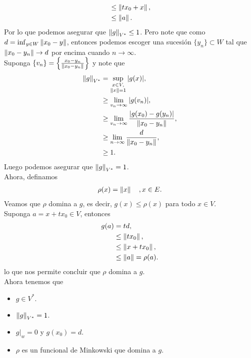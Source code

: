 \begin{homeworkProblem}
\begin{solution}
\begin{enumerate}
\begin{align*}
          &\leq \left\|tx_0+x\right\|,\\
          &\leq \left\|a\right\|.
        \end{align*}
        Por lo que podemos asegurar que $\left\|g\right\|_{V^{*}}\leq 1$. Pero note que como $d=\inf_{y\in W}\left\|x_0-y\right\|$, entonces podemos escoger una sucesión $\{y_n\}\subset W$ tal que $\left\|x_0-y_n\right\|\to d$ por encima cuando $n\to \infty$.\\
        Suponga $\{v_n\}=\left\{\frac{x_0-y_n}{\left\|x_0-y_n\right\|}\right\}$ y note que
        \begin{align*}
          \left\|g\right\|_{V^*}&=\sup_{\substack{x\in V,\\\left\|x\right\|=1}}|g(x)|,\\
          &\geq \lim_{v_n \to \infty}|g(v_n)|,\\
          &\geq \lim_{v_n \to \infty}\frac{\left| g(x_0)-g(y_n)\right|}{\left\|x_0-y_n\right\|},\\
          &\geq \lim_{n \to \infty}\frac{d}{\left\|x_0-y_n\right\|},\\
          &\geq 1.
        \end{align*}
        Luego podemos asegurar que $\left\|g\right\|_{V^*}=1$.\\
        Ahora, definamos
        \begin{align*}
          \rho(x)=\left\|x\right\|\quad,x\in E.
        \end{align*}
        Veamos que $\rho$ domina a $g$, es decir, $g(x)\leq \rho(x)$ para todo $x\in V$.\\
        Suponga $a=x+tx_0\in V$, entonces
        \begin{align*}
          g(a)&=td,\\
          &\leq \left\|tx_0\right\|,\\
          &\leq \left\|x+tx_0\right\|,\\
          &\leq \left\|a\right\|=\rho(a).
        \end{align*}
        lo que nos permite concluir que $\rho$  domina a $g$.\\
        Ahora tenemos que
        \begin{itemize}
          \item $g\in V^{*}$.\\
          \item $\left\|g\right\|_{V^*}=1$.\\
          \item $g|_{w}=0$ y $g(x_0)=d$.\\
          \item $\rho$ es un funcional de Minkowski que domina a $g$.

\end{itemize}
\end{enumerate}
\end{solution}
\end{homeworkProblem}
